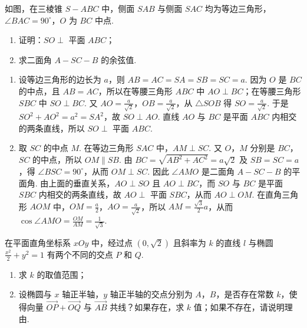 \begin{problem}
如图，在三棱锥 \(S - ABC\) 中，侧面 \(SAB\) 与侧面 \(SAC\) 均为等边三角形，\(\angle BAC = 90^{\circ}\)，\(O\) 为 \(BC\) 中点.

\begin{enumerate}
\item 证明：\(SO \perp\) 平面 \(ABC\)；
\item 求二面角 \(A - SC - B\) 的余弦值.
\end{enumerate}

\end{problem}

\begin{solution}
\begin{enumerate}
\item
设等边三角形的边长为 \(a\)，则 \(AB=AC=SA=SB=SC=a\). 因为 \(O\) 是 \(BC\) 的中点，且 \(AB=AC\)，所以在等腰三角形 \(ABC\) 中 \(AO\perp BC\)；在等腰三角形 \(SBC\) 中 \(SO\perp BC\). 又
\(AO=\frac{a}{\sqrt{2}}\)，\(OB=\frac{a}{\sqrt{2}}\)，从 \(\triangle SOB\) 得 \(SO=\frac{a}{\sqrt{2}}\). 于是 \(SO^2+AO^2=a^2=SA^2\)，故 \(SO\perp AO\). 直线 \(AO\) 与 \(BC\) 是平面 \(ABC\) 内相交的两条直线，所以 \(SO\perp\) 平面 \(ABC\).

\item
取 \(SC\) 的中点 \(M\). 在等边三角形 \(SAC\) 中，\(AM\perp SC\). 又 \(O\)，\(M\) 分别是 \(BC\)，\(SC\) 的中点，所以 \(OM\parallel SB\). 由 \(BC=\sqrt{AB^2+AC^2}=a\sqrt{2}\) 及 \(SB=SC=a\)，得 \(\angle BSC=90^{\circ}\)，从而 \(OM\perp SC\). 因此 \(\angle AMO\) 是二面角 \(A-SC-B\) 的平面角. 由上面的垂直关系，\(AO\perp SO\) 且 \(AO\perp BC\)，而 \(SO\) 与 \(BC\) 是平面 \(SBC\) 内相交的两条直线，故 \(AO\perp\) 平面 \(SBC\)，从而 \(AO\perp OM\). 在直角三角形 \(AOM\) 中，\(OM=\frac{a}{2}\)，\(AO=\frac{a}{\sqrt{2}}\)，所以 \(AM=\frac{\sqrt{3}}{2}a\)，从而
\(\cos\angle AMO=\frac{OM}{AM}=\frac{1}{\sqrt{3}}\).
\end{enumerate}
\end{solution}

\begin{problem}
在平面直角坐标系 \(xOy\) 中，经过点 \((0, \sqrt{2})\) 且斜率为 \(k\) 的直线 \(l\) 与椭圆 \(\frac{x^2}{2} + y^2 = 1\) 有两个不同的交点 \(P\) 和 \(Q\).

\begin{enumerate}
\item 求 \(k\) 的取值范围；
\item 设椭圆与 \(x\) 轴正半轴，\(y\) 轴正半轴的交点分别为 \(A\)，\(B\)，是否存在常数 \(k\)，使得向量 \(\overrightarrow{OP} + \overrightarrow{OQ}\) 与 \(\overrightarrow{AB}\) 共线？如果存在，求 \(k\) 值；如果不存在，请说明理由.
\end{enumerate}
\end{problem}

